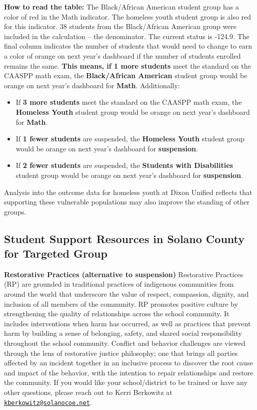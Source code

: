 \documentclass[
  10pt,
  letterpaper,
  DIV=11,
  numbers=noendperiod]{scrartcl}
\begin{document}
\textbf{How to read the table:} The Black/African American student group
has a color of red in the Math indicator. The homeless youth student
group is also red for this indicator. 38 students from the Black/African
American group were included in the calculation -- the denominator. The
current status is -124.9. The final column indicates the number of
students that would need to change to earn a color of orange on next
year's dashboard if the number of students enrolled remains the same.
\textbf{This means, if 1 more students} meet the standard on the CAASPP
math exam, the \textbf{Black/African American} student group would be
orange on next year's dashboard for \textbf{Math}. Additionally:

\begin{itemize}
\item
  If \textbf{3 more students} meet the standard on the CAASPP math exam,
  the \textbf{Homeless Youth} student group would be orange on next
  year's dashboard for \textbf{Math}.
\item
  If \textbf{1 fewer students} are suspended, the \textbf{Homeless
  Youth} student group would be orange on next year's dashboard for
  \textbf{suspension}.
\item
  If \textbf{2 fewer students} are suspended, the \textbf{Students with
  Disabilities} student group would be orange on next year's dashboard
  for \textbf{suspension}.
\end{itemize}

Analysis into the outcome data for homeless youth at Dixon Unified
reflects that supporting these vulnerable populations may also improve
the standing of other groups.

\subsection{Student Support Resources in Solano County for Targeted
Group}\label{student-support-resources-in-solano-county-for-targeted-group}

\textbf{Restorative Practices (alternative to suspension)} Restorative
Practices (RP) are grounded in traditional practices of indigenous
communities from around the world that underscore the value of respect,
compassion, dignity, and inclusion of all members of the community. RP
promotes positive culture by strengthening the quality of relationships
across the school community. It includes interventions when harm has
occurred, as well as practices that prevent harm by building a sense of
belonging, safety, and shared social responsibility throughout the
school community. Conflict and behavior challenges are viewed through
the lens of restorative justice philosophy; one that brings all parties
affected by an incident together in an inclusive process to discover the
root cause and impact of the behavior, with the intention to repair
relationships and restore the community. If you would like your
school/district to be trained or have any other questions, please reach
out to Kerri Berkowitz at
\href{mailto:kberkowitz@solanocoe.net}{\nolinkurl{kberkowitz@solanocoe.net}}.
\end{document}
